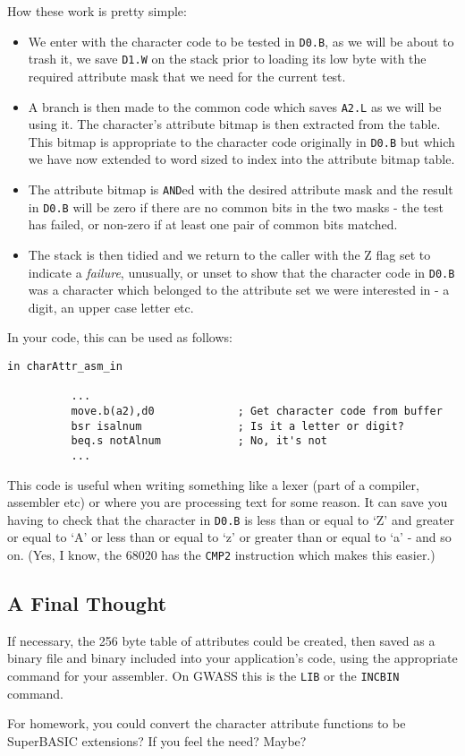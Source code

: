 How these work is pretty simple:
\begin{itemize}
\item We enter with the character code to be tested in \lstinline!D0.B!,
as we will be about to trash it, we save \lstinline!D1.W! on the
stack prior to loading its low byte with the required attribute mask
that we need for the current test.
\item A branch is then made to the common code which saves \lstinline!A2.L!
as we will be using it. The character's attribute bitmap is then extracted
from the table. This bitmap is appropriate to the character code originally
in \lstinline!D0.B! but which we have now extended to word sized
to index into the attribute bitmap table.
\item The attribute bitmap is \lstinline!AND!ed with the desired attribute
mask and the result in \lstinline!D0.B! will be zero if there are
no common bits in the two masks - the test has failed, or non-zero
if at least one pair of common bits matched.
\item The stack is then tidied and we return to the caller with the Z flag
set to indicate a \emph{failure}, unusually, or unset to show that
the character code in \lstinline!D0.B! was a character which belonged
to the attribute set we were interested in - a digit, an upper case
letter etc.
\end{itemize}
In your code, this can be used as follows:

\begin{lstlisting}[caption={Using the \protect\url{charAttr_asm_in} routines}]
          in charAttr_asm_in

          ...
          move.b(a2),d0             ; Get character code from buffer
          bsr isalnum               ; Is it a letter or digit?
          beq.s notAlnum            ; No, it's not
          ...
\end{lstlisting}

This code is useful when writing something like a lexer (part of a
compiler, assembler etc) or where you are processing text for some
reason. It can save you having to check that the character in \lstinline!D0.B!
is less than or equal to `Z' and greater or equal to `A' or less than
or equal to `z' or greater than or equal to `a' - and so on. (Yes,
I know, the 68020 has the \lstinline!CMP2! instruction which makes
this easier.)

\subsection{A Final Thought}

If necessary, the 256 byte table of attributes could be created, then
saved as a binary file and binary included into your application's
code, using the appropriate command for your assembler. On GWASS this
is the \lstinline!LIB! or the \lstinline!INCBIN! command.

For homework, you could convert the character attribute functions
to be SuperBASIC extensions? If you feel the need? Maybe?



